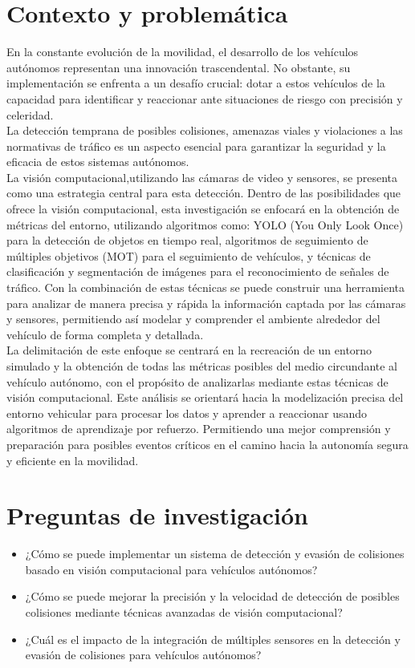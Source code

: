 \documentclass[10pt,letterpaper,final]{article}
\begin{document}
    \section*{Contexto y problemática}
    \noindent En la constante evolución de la movilidad, el desarrollo de los vehículos autónomos representan una innovación trascendental.
    No obstante, su implementación se enfrenta a un desafío crucial: dotar a estos vehículos de la capacidad para identificar
    y reaccionar ante situaciones de riesgo con precisión y celeridad. \\
    La detección temprana de posibles colisiones, amenazas viales y violaciones a las normativas de tráfico
    es un aspecto esencial para garantizar la seguridad y la eficacia de estos sistemas autónomos.\\
    La visión computacional,utilizando las cámaras de video y sensores, se presenta como una estrategia central para esta detección.
    Dentro de las posibilidades que ofrece la visión computacional, esta investigación se enfocará en la obtención de métricas del entorno,
    utilizando algoritmos como:
    YOLO (You Only Look Once) para la detección de objetos en tiempo real,
    algoritmos de seguimiento de múltiples objetivos (MOT) para el seguimiento de vehículos, y
    técnicas de clasificación y segmentación de imágenes para el reconocimiento de señales de tráfico.
    Con la combinación de estas técnicas se puede construir una herramienta para analizar de manera precisa y rápida
    la información captada por las cámaras y sensores, permitiendo así modelar y comprender el ambiente alrededor del vehículo de forma completa y detallada.\\
    La delimitación de este enfoque se centrará en la recreación de un entorno simulado y la obtención de todas las métricas posibles
    del medio circundante al vehículo autónomo, con el propósito de analizarlas mediante estas técnicas de visión computacional.
    Este análisis se orientará hacia la modelización precisa del entorno vehicular para procesar los datos y aprender a reaccionar
    usando algoritmos de aprendizaje por refuerzo. Permitiendo una mejor comprensión y preparación para posibles
    eventos críticos en el camino hacia la autonomía segura y eficiente en la movilidad.
    \clearpage
    
    \section*{Preguntas de investigación}
    \begin{itemize}
        \item ¿Cómo se puede implementar un sistema de detección y evasión de colisiones basado en visión computacional para vehículos autónomos?
        \item ¿Cómo se puede mejorar la precisión y la velocidad de detección de posibles colisiones mediante técnicas avanzadas de visión computacional?
        \item ¿Cuál es el impacto de la integración de múltiples sensores en la detección y evasión de colisiones para vehículos autónomos?
    \end{itemize}
    
\end{document}
